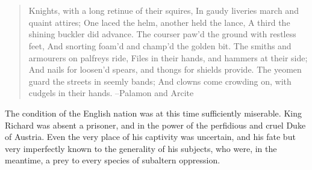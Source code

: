 \chapter{}

\begin{quote}
Knights, with a long retinue of their squires,
In gaudy liveries march and quaint attires;
One laced the helm, another held the lance,
A third the shining buckler did advance.
The courser paw'd the ground with restless feet,
And snorting foam'd and champ'd the golden bit.
The smiths and armourers on palfreys ride,
Files in their hands, and hammers at their side;
And nails for loosen'd spears, and thongs for shields provide.
The yeomen guard the streets in seemly bands;
And clowns come crowding on, with cudgels in their hands.
--Palamon and Arcite
\end{quote}

The condition of the English nation was at this time sufficiently
miserable. King Richard was absent a prisoner, and in the power of the
perfidious and cruel Duke of Austria. Even the very place of his
captivity was uncertain, and his fate but very imperfectly known to the
generality of his subjects, who were, in the meantime, a prey to every
species of subaltern oppression.


